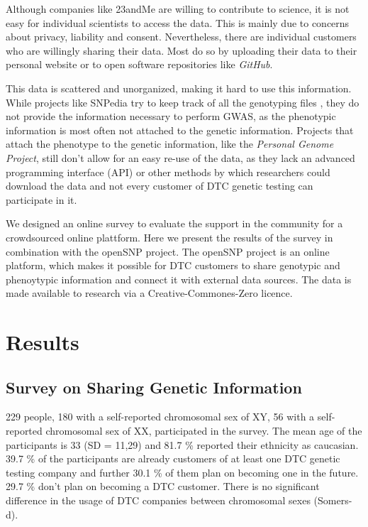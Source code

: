 \documentclass[10pt]{article}
\begin{document}
Although companies like 23andMe are willing to contribute to science, it is not easy for individual scientists to access the data. This is mainly due to concerns about privacy, liability and consent. Nevertheless, there are individual customers who are willingly sharing their data. Most do so by uploading their data to their personal website or to open software repositories like \textit{GitHub}. 

This data is scattered and unorganized, making it hard to use this information. While projects like SNPedia try to keep track of all the genotyping files \cite{Cariaso2011}, they do not provide the information necessary to perform GWAS, as the phenotypic information is most often not attached to the genetic information. Projects that attach the phenotype to the genetic information, like the \textit{Personal Genome Project}, still don't allow for an easy re-use of the data, as they lack an advanced programming interface (API) or other methods by which researchers could download the data and not every customer of DTC genetic testing can participate in it.  

We designed an online survey to evaluate the support in the community for a crowdsourced online plattform. Here we present the results of the survey in combination with the openSNP project. The openSNP project is an online platform, which makes it possible for DTC customers to share genotypic and phenoytypic information and connect it with external data sources. The data is made available to research via a Creative-Commones-Zero licence.

\section*{Results}

\subsection*{Survey on Sharing Genetic Information}
229 people, 180 with a self-reported chromosomal sex of XY, 56 with a self-reported chromosomal sex of XX, participated in the survey. The mean age of the participants is 33 (SD = 11,29) and 81.7 \% reported their ethnicity as caucasian. 39.7 \% of the participants are already customers of at least one DTC genetic testing company and further 30.1 \% of them plan on becoming one in the future. 29.7 \% don't plan on becoming a DTC customer. There is no significant difference in the usage of DTC companies between chromosomal sexes (Somers-d). 
\end{document}
